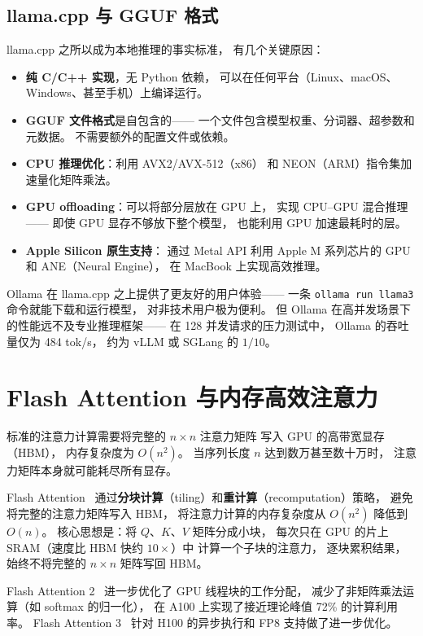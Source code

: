 \subsection{llama.cpp 与 GGUF 格式}

llama.cpp 之所以成为本地推理的事实标准，
有几个关键原因：
\begin{itemize}[noitemsep]
  \item \textbf{纯 C/C++ 实现}，无 Python 依赖，
        可以在任何平台（Linux、macOS、Windows、甚至手机）上编译运行。
  \item \textbf{GGUF 文件格式}是自包含的——
        一个文件包含模型权重、分词器、超参数和元数据。
        不需要额外的配置文件或依赖。
  \item \textbf{CPU 推理优化}：利用 AVX2/AVX-512（x86）
        和 NEON（ARM）指令集加速量化矩阵乘法。
  \item \textbf{GPU offloading}：可以将部分层放在 GPU 上，
        实现 CPU--GPU 混合推理——
        即使 GPU 显存不够放下整个模型，
        也能利用 GPU 加速最耗时的层。
  \item \textbf{Apple Silicon 原生支持}：
        通过 Metal API 利用 Apple M 系列芯片的 GPU 和 ANE（Neural Engine），
        在 MacBook 上实现高效推理。
\end{itemize}

Ollama 在 llama.cpp 之上提供了更友好的用户体验——
一条 \texttt{ollama run llama3} 命令就能下载和运行模型，
对非技术用户极为便利。
但 Ollama 在高并发场景下的性能远不及专业推理框架——
在 128 并发请求的压力测试中，
Ollama 的吞吐量仅为 484 tok/s，
约为 vLLM 或 SGLang 的 $1/10$。


\section{Flash Attention 与内存高效注意力}

标准的注意力计算需要将完整的 $n \times n$ 注意力矩阵
写入 GPU 的高带宽显存（HBM），
内存复杂度为 $O(n^2)$。
当序列长度 $n$ 达到数万甚至数十万时，
注意力矩阵本身就可能耗尽所有显存。

Flash Attention~\cite{dao2022flashattention}
通过\textbf{分块计算}（tiling）和\textbf{重计算}（recomputation）策略，
避免将完整的注意力矩阵写入 HBM，
将注意力计算的内存复杂度从 $O(n^2)$ 降低到 $O(n)$。
核心思想是：将 $Q$、$K$、$V$ 矩阵分成小块，
每次只在 GPU 的片上 SRAM（速度比 HBM 快约 $10\times$）中
计算一个子块的注意力，
逐块累积结果，始终不将完整的 $n \times n$ 矩阵写回 HBM。

Flash Attention 2~\cite{dao2023flashattention2}
进一步优化了 GPU 线程块的工作分配，
减少了非矩阵乘法运算（如 softmax 的归一化），
在 A100 上实现了接近理论峰值 72\% 的计算利用率。
Flash Attention 3~\cite{shah2024flashattention3}
针对 H100 的异步执行和 FP8 支持做了进一步优化。

